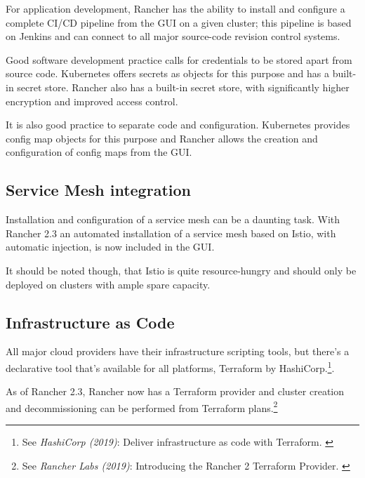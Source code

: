 For application development, Rancher has the ability to install and configure a complete CI/CD pipeline from the GUI on a given cluster; this pipeline is based on Jenkins and can connect to all major source-code revision control systems.

Good software development practice calls for credentials to be stored apart from source code. Kubernetes offers secrets as objects for this purpose and has a built-in secret store. Rancher also has a built-in secret store, with significantly higher encryption and improved access control.

It is also good practice to separate code and configuration. Kubernetes provides config map objects for this purpose and Rancher allows the creation and configuration of config maps from the GUI.

\subsection{Service Mesh integration}

Installation and configuration of a service mesh can be a daunting task. With Rancher 2.3 an automated installation of a service mesh based on Istio, with automatic injection, is now included in the GUI.

It should be noted though, that Istio is quite resource-hungry and should only be deployed on clusters with ample spare capacity.

\subsection{Infrastructure as Code}

All major cloud providers have their infrastructure scripting tools, but there's a declarative tool that's available for all platforms, Terraform by HashiCorp.\footnote{See \textit{HashiCorp (2019)}: Deliver infrastructure as code with Terraform. \cite{terraform}}.

As of Rancher 2.3, Rancher now has a Terraform provider and cluster creation and decommissioning can be performed from Terraform plans.\footnote{See \textit{Rancher Labs (2019)}: Introducing the Rancher 2 Terraform Provider. \cite{terraformProvider}}
